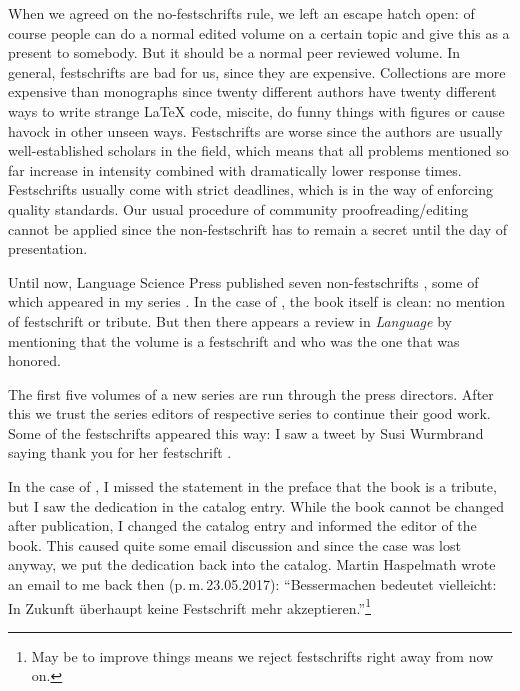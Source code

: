 \documentclass[output=paper,colorlinks,citecolor=brown]{langscibook}
\begin{document}
When we agreed on the no-festschrifts rule, we left an escape hatch open: of course people can do a
normal edited volume on a certain topic and give this as a present to somebody. But it should be a
normal peer reviewed volume. In general, festschrifts are bad for us, since they are
expensive. Collections are more expensive than monographs since twenty different authors have twenty
different ways to write strange \LaTeX{} code, miscite, do funny things with figures or cause havock
in other unseen ways. Festschrifts are worse since the authors are usually well-established scholars
in the field, which means that all problems mentioned so far increase in intensity combined with
dramatically lower response times. Festschrifts usually come with strict deadlines, which is in the
way of enforcing quality standards. Our usual procedure of community proofreading/editing cannot be
applied since the non-festschrift has to remain a secret until the day of presentation. 

Until now, Language Science Press published seven non-festschrifts \citep{BS2017a-ed,BBDV2020a-ed,LS2021a-ed,MS2022a-ed,BHZ2017a-ed,BBDGN2018a-ed}, some of which appeared
in my series \citep{BHZ2017a-ed,BBDGN2018a-ed}.
%
% 
% 
% 
%
%
%
%
%
In the case of , the book itself is clean: no mention of festschrift or
tribute. But then there appears a review in \emph{Language} by \citet{Bauer2020a-u} mentioning that the
volume is a festschrift and who was the one that was honored. 

The first five volumes of a new series are run through the press directors. After this we trust the
series editors of respective series to continue their good work. Some of the festschrifts appeared
this way: I saw a tweet by Susi Wurmbrand saying thank you for her festschrift \citep{LS2021a-ed}.


In the case of , I missed the statement in the preface that the book is a tribute,
but I saw the dedication in the catalog entry. While the book cannot be changed after publication, I
changed the catalog entry and informed the editor of the book. This caused quite some email
discussion and since the case was lost anyway, we put the dedication back into the catalog. 
Martin Haspelmath wrote an email to me back then
(p.\,m.\,23.05.2017): ``Bessermachen bedeutet viel\-leicht: In Zukunft überhaupt keine Festschrift mehr
akzeptieren.''\footnote{
May be to improve things means we reject festschrifts right away from now on.
}
\end{document}
